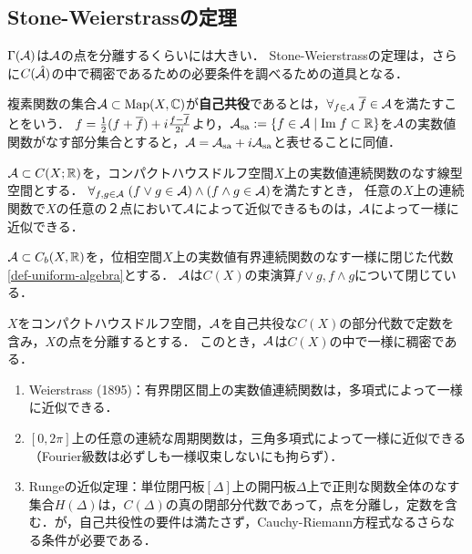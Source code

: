 \documentclass[uplatex,dvipdfmx]{jsreport}
\begin{document}
\subsection{Stone-Weierstrassの定理}

\begin{tcolorbox}[colframe=ForestGreen, colback=ForestGreen!10!white,breakable,colbacktitle=ForestGreen!40!white,coltitle=black,fonttitle=\bfseries\sffamily,
title=]
    $\Gamma(\mathcal{A})$は$\mathcal{A}$の点を分離するくらいには大きい．
    Stone-Weierstrassの定理は，さらに$C(\hat{\mathcal{A}})$の中で稠密であるための必要条件を調べるための道具となる．
\end{tcolorbox}

\begin{definition}
    複素関数の集合$\mathcal{A}\subset\mathrm{Map}(X,\mathbb{C})$が\textbf{自己共役}であるとは，$\forall_{f\in\mathcal{A}}\;\overline{f}\in\mathcal{A}$を満たすことをいう．
    $f=\frac{1}{2}(f+\overline{f})+i\frac{f-\overline{f}}{2i}$より，$\mathcal{A}_{\mathrm{sa}}:=\left\{f\in\mathcal{A}\mid\mathrm{Im}\; f\subset\mathbb{R}\right\}$を$\mathcal{A}$の実数値関数がなす部分集合とすると，$\mathcal{A}=\mathcal{A}_{\mathrm{sa}}+i\mathcal{A}_{\mathrm{sa}}$と表せることに同値．
\end{definition}

\begin{lemma}
    $\mathcal{A}\subset C(X;\mathbb{R})$を，コンパクトハウスドルフ空間$X$上の実数値連続関数のなす線型空間とする．
    $\forall_{f,g\in\mathcal{A}}\;(f\lor g\in\mathcal{A})\land (f\land g\in\mathcal{A})$を満たすとき，
    任意の$X$上の連続関数で$X$の任意の２点において$\mathcal{A}$によって近似できるものは，$\mathcal{A}$によって一様に近似できる．
\end{lemma}

\begin{lemma}
    $\mathcal{A}\subset C_b(X,\mathbb{R})$を，位相空間$X$上の実数値有界連続関数のなす一様に閉じた代数\ref{def-uniform-algebra}とする．
    $\mathcal{A}$は$C(X)$の束演算$f\lor g,f\land g$について閉じている．
\end{lemma}

\begin{theorem}[Stone (1948)]
    $X$をコンパクトハウスドルフ空間，$\mathcal{A}$を自己共役な$C(X)$の部分代数で定数を含み，$X$の点を分離するとする．
    このとき，$\mathcal{A}$は$C(X)$の中で一様に稠密である．
\end{theorem}
\begin{example}\mbox{}
    \begin{enumerate}
        \item Weierstrass (1895)：有界閉区間上の実数値連続関数は，多項式によって一様に近似できる．
        \item $[0,2\pi]$上の任意の連続な周期関数は，三角多項式によって一様に近似できる（Fourier級数は必ずしも一様収束しないにも拘らず）．
        \item Rungeの近似定理：単位閉円板$[\Delta]$上の開円板$\Delta$上で正則な関数全体のなす集合$H(\Delta)$は，$C(\Delta)$の真の閉部分代数であって，点を分離し，定数を含む．が，自己共役性の要件は満たさず，Cauchy-Riemann方程式なるさらなる条件が必要である．
    \end{enumerate}
\end{example}
\end{document}

